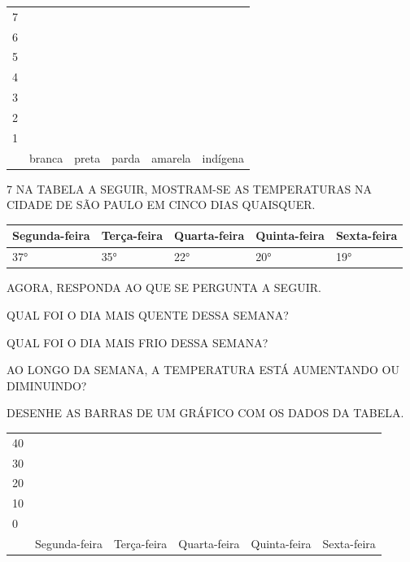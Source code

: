 \begin{longtable}[]{@{}llllll@{}}
\toprule
7 & & & & &\tabularnewline
6 & & & & &\tabularnewline
5 & & & & &\tabularnewline
4 & & & & &\tabularnewline
3 & & & & &\tabularnewline
2 & & & & &\tabularnewline
1 & & & & &\tabularnewline
& branca & preta & parda & amarela & indígena\tabularnewline
\bottomrule
\end{longtable}


\num{7} NA TABELA A SEGUIR, MOSTRAM-SE AS TEMPERATURAS NA CIDADE DE SÃO PAULO EM CINCO
DIAS QUAISQUER.


\begin{longtable}[]{@{}lllll@{}}
\toprule
Segunda-feira & Terça-feira & Quarta-feira & Quinta-feira & Sexta-feira\tabularnewline
\midrule
\endhead
37° & 35° & 22° & 20° & 19°\tabularnewline
\bottomrule
\end{longtable}

AGORA, RESPONDA AO QUE SE PERGUNTA A SEGUIR.

\begin{escolha}
\item QUAL FOI O DIA MAIS QUENTE DESSA SEMANA?


\item QUAL FOI O DIA MAIS FRIO DESSA SEMANA?


\item AO LONGO DA SEMANA, A TEMPERATURA ESTÁ AUMENTANDO OU DIMINUINDO?


\item DESENHE AS BARRAS DE UM GRÁFICO COM OS DADOS DA TABELA.

\begin{longtable}[]{@{}llllll@{}}
\toprule
40 & & & & &\tabularnewline
30 & & & & &\tabularnewline
20 & & & & &\tabularnewline
10 & & & & &\tabularnewline
0 & & & & &\tabularnewline
& Segunda-feira & Terça-feira & Quarta-feira & Quinta-feira & Sexta-feira\tabularnewline
\bottomrule
\end{longtable}

\end{escolha}

